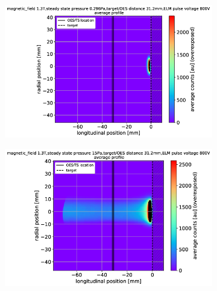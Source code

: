 \begin{figure}[!ht]
     \centering
     \begin{subfigure}{0.36\textwidth}
         \centering
         \vspace*{-0mm}
         \includegraphics[width=\textwidth,trim={20 0 8 8},clip]{Chapters/chapter3/figs/fast_camera_merge_95_average3.png}
         \vspace*{-17mm}
         {\color{white}\caption{\phantom{weww}}\label{fig:ELMa}}
     \end{subfigure}
     \hfill
     \begin{subfigure}{0.31\textwidth}
         \centering
         \vspace*{-0mm}
         \includegraphics[width=\textwidth,trim={34 0 8 7.5},clip]{Chapters/chapter3/figs/fast_camera_merge_85_average3.png}
         \vspace*{-17mm}

\end{subfigure}
\end{figure}

